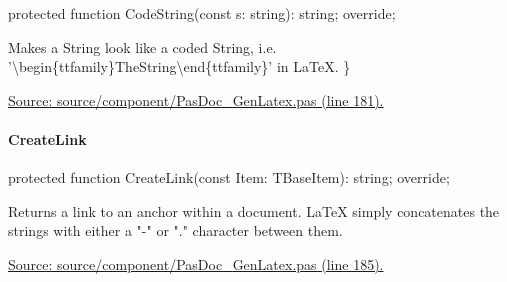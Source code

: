 \documentclass{report}
\newif\ifpdf
\begin{document}
\label{PasDoc_GenLatex.TTexDocGenerator-CodeString}
\begin{list}{}{
\setlength{\itemindent}{0cm}
\setlength{\listparindent}{0cm}
\setlength{\leftmargin}{\evensidemargin}
\addtolength{\leftmargin}{\tmplength}
\settowidth{\labelsep}{X}
\addtolength{\leftmargin}{\labelsep}
\setlength{\labelwidth}{\tmplength}
}
\item[\textbf{Declaration}\hfill]
\ifpdf
\begin{flushleft}
\fi
\begin{ttfamily}
protected function CodeString(const s: string): string; override;\end{ttfamily}

\ifpdf
\end{flushleft}
\fi

\par
\item[\textbf{Description}]
Makes a String look like a coded String, i.e. '{\textbackslash}begin{\{}ttfamily{\}}TheString{\textbackslash}end{\{}ttfamily{\}}' in LaTeX. {\}}\par
\href{https://github.com/pasdoc/pasdoc/blob/master/source/component/PasDoc_GenLatex.pas#L181}{Source: source/component/PasDoc{\_}GenLatex.pas (line 181).}

\end{list}
\paragraph*{CreateLink}\hspace*{\fill}

\label{PasDoc_GenLatex.TTexDocGenerator-CreateLink}
\begin{list}{}{
\setlength{\itemindent}{0cm}
\setlength{\listparindent}{0cm}
\setlength{\leftmargin}{\evensidemargin}
\addtolength{\leftmargin}{\tmplength}
\settowidth{\labelsep}{X}
\addtolength{\leftmargin}{\labelsep}
\setlength{\labelwidth}{\tmplength}
}
\item[\textbf{Declaration}\hfill]
\ifpdf
\begin{flushleft}
\fi
\begin{ttfamily}
protected function CreateLink(const Item: TBaseItem): string; override;\end{ttfamily}

\ifpdf
\end{flushleft}
\fi

\par
\item[\textbf{Description}]
Returns a link to an anchor within a document. LaTeX simply concatenates the strings with either a "{-}" or "." character between them.\par
\href{https://github.com/pasdoc/pasdoc/blob/master/source/component/PasDoc_GenLatex.pas#L185}{Source: source/component/PasDoc{\_}GenLatex.pas (line 185).}

\end{list}
\end{document}
